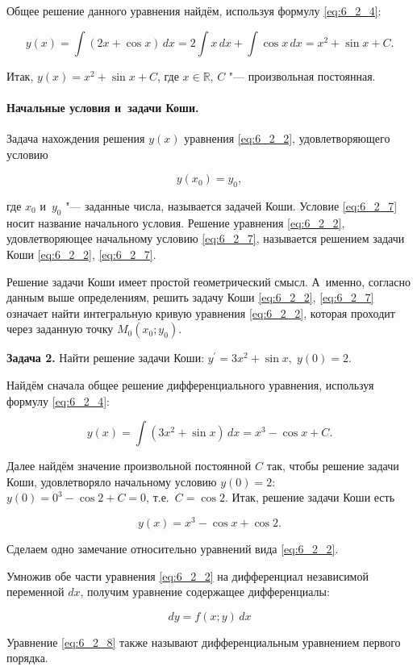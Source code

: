 Общее решение данного уравнения найдём, используя формулу \eqref{eq:6_2_4}:

\begin{equation*}
y(x) = \int (2x + \cos x) \, dx = 
2 \int x \, dx + \int \cos x \, dx = 
x^{2} + \sin x + C.
\end{equation*}

\noindent
Итак, $y(x) = x^{2} + \sin x + C$, где $x \in \mathbb{R}$,
$C$ "--- произвольная постоянная.

\paragraph{Начальные условия и~задачи Коши.}
Задача нахождения решения $y(x)$ уравнения \eqref{eq:6_2_2}, удовлетворяющего условию

\begin{equation}\label{eq:6_2_7}
y(x_{0}) = y_{0},
\end{equation}

\noindent
где $x_{0}$ и~$y_{0}$ "--- заданные числа, называется задачей Коши.
Условие \eqref{eq:6_2_7} носит название начального условия.
Решение уравнения \eqref{eq:6_2_2}, удовлетворяющее начальному условию \eqref{eq:6_2_7},
называется решением задачи Коши \eqref{eq:6_2_2}, \eqref{eq:6_2_7}.

Решение задачи Коши имеет простой геометрический смысл. А~именно, согласно данным
выше определениям, решить задачу Коши \eqref{eq:6_2_2}, \eqref{eq:6_2_7} означает
найти интегральную кривую уравнения \eqref{eq:6_2_2}, которая проходит через
заданную точку $M_{0}(x_{0}; y_{0})$.

\textbf{Задача 2.}\label{ex:6_2_2} Найти решение задачи Коши:
$y^\prime = 3x^{2} + \sin x, \; y(0) = 2$.

Найдём сначала общее решение дифференциального уравнения,
используя формулу \eqref{eq:6_2_4}:

\begin{equation*}
y(x) = \int (3x^{2} + \sin x) \, dx = x^{3} - \cos x + C.
\end{equation*}

\noindent
Далее найдём значение произвольной постоянной $C$ так, чтобы решение задачи Коши,
удовлетворяло начальному условию $y(0) = 2$: $y(0) = 0^{3} - \cos 2 + C = 0$,
т.е.\ $C = \cos 2$. Итак, решение задачи Коши есть

\begin{equation*}
y(x) = x^{3} - \cos x + \cos 2.
\end{equation*}

Сделаем одно замечание относительно уравнений вида \eqref{eq:6_2_2}.

Умножив обе части уравнения \eqref{eq:6_2_2} на дифференциал независимой переменной
$dx$, получим уравнение содержащее дифференциалы: 

\begin{equation}\label{eq:6_2_8}
dy = f(x; y) \, dx
\end{equation}

\noindent
Уравнение \eqref{eq:6_2_8} также называют дифференциальным уравнением первого порядка.
